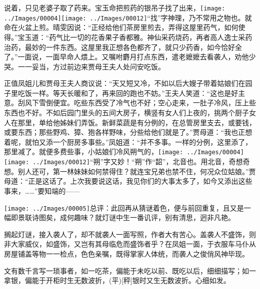 说着，只见老婆子取了药来。宝玉命把煎药的银吊子找了出来，{\texttt{[image: ../Images/00004]}\texttt{[image: ../Images/00012]}\footnotesize \kaishu ``找''字神理，乃不常用之物也。}就命在火盆上煎。晴雯因说：``正经给他们茶房里煎去，弄得这屋里药气，如何使得。''宝玉道：``药气比一切的花香果子香都雅。神仙采药烧药，再者高人逸士采药治药，最妙的一件东西。这屋里我正想各色都齐了，就只少药香，如今恰好全了。''一面说，一面早命人煨上。又嘱咐麝月打点东西，遣老嬷嬷去看袭人，劝他少哭。一一妥当，方过前边来贾母王夫人处问安吃饭。

正值凤姐儿和贾母王夫人商议说：``天又短又冷，不如以后大嫂子带着姑娘们在园子里吃饭一样。等天长暖和了，再来回的跑也不妨。''王夫人笑道：``这也是好主意。刮风下雪倒便宜。吃些东西受了冷气也不好；空心走来，一肚子冷风，压上些东西也不好。不如后园门里头的五间大房子，横竖有女人们上夜的，挑两个厨子女人在那里，单给他姊妹们弄饭。新鲜菜蔬是有分例的，在总管房里支去，或要钱，或要东西；那些野鸡、獐、狍各样野味，分些给他们就是了。''贾母道：``我也正想着呢，就怕又添一个厨房多事些。''凤姐道：``并不多事。一样的分例，这里添了，那里减了。就便多费些事，小姑娘们冷风朔气的，{\texttt{[image: ../Images/00004]}\texttt{[image: ../Images/00012]}\footnotesize \kaishu ``朔''字又妙！``朔''作``韶''，北音也。用北音，奇想奇想。}别人还可，第一林妹妹如何禁得住？就连宝兄弟也禁不住，何况众位姑娘。''贾母道：``正是这话了。上次我要说这话，我见你们的大事太多了，如今又添出这些事来，\ldots{}\ldots{}''要知端的------

{\texttt{[image: ../Images/00005]}\kaishu 总评：此回再从猜谜着色，便与前回重复，且又是一幅即景联诗图矣，成何趣味？就灯谜中生一番讥评，别有清思，迥非凡艳。}

{\kaishu 搁起灯谜，接入袭人了，却不就袭人一面写照，作者大有苦心。盖袭人不盛饰，则非大家威仪，如盛饰，又岂有其母临危而盛饰者乎？在凤姐一面，于衣服车马仆从房屋铺盖等物一一检点，色色亲嘱，既得掌家人体统，而袭人之俊俏风神毕现。}

{\kaishu 文有数千言写一琐事者，如一吃茶，偏能于未吃以前、既吃以后，细细描写；如一拿银，偏能于开柜时生无数波折，{{(平)}}{[}秤{]}银时又生无数波折。心细如发。}
